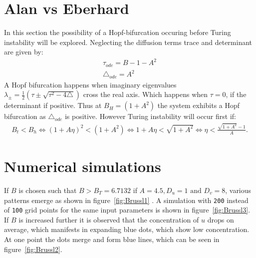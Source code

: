 \section{Alan vs Eberhard}
In this section the possibility of a Hopf-bifurcation occuring before Turing instability will be explored. Neglecting the diffusion terms trace and determinant are given by:
\begin{align}
\tau_{ode} = B - 1 - A^2 \\
\triangle_{ode} = A^2
\end{align}
A Hopf bifurcation happens when imaginary eigenvalues $\lambda_\pm = \frac{1}{2}(\tau \pm \sqrt{\tau^2 - 4\triangle})$ cross the real axis. Which happens when $\tau = 0$, if the determinant if positive. Thus at $B_H = (1 + A^2)$ the system exhibits a Hopf bifurcation as $\triangle_{ode}$ is positive. However Turing instability will occur first if:
\begin{align}
B_t < B_h \Leftrightarrow (1 + A\eta)^2 < (1 + A^2) \Leftrightarrow 1 + A\eta < \sqrt{1 + A^2} \Leftrightarrow \eta < \frac{\sqrt{1 + A^2} - 1}{A}.
\end{align}
\section{Numerical simulations}
If $B$ is chosen such that $B > B_T = 6.7132$ if $A = 4.5,D_u = 1 \text{ and } D_v = 8$, various patterns emerge as shown in figure~\ref{fig:Brussl1} . A simulation with \texttt{200} instead of \texttt{100} grid points for the same input parameters is shown in figure~\ref{fig:Brussl3}. If $B$ is increased further it is observed that the concentration of $u$ drops on average, which manifests in expanding blue dots, which show low concentration. At one point the dots merge and form blue lines, which can be seen in figure~\ref{fig:Brussl2}.

